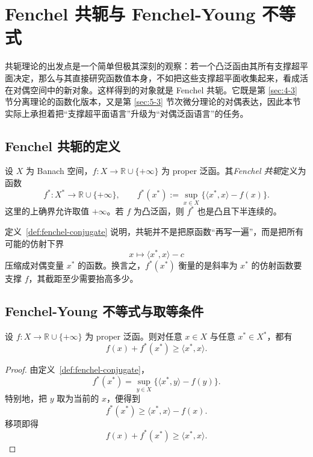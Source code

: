 \section{Fenchel 共轭与 Fenchel-Young 不等式}

\label{sec:6-1}

共轭理论的出发点是一个简单但极其深刻的观察：若一个凸泛函由其所有支撑超平面决定，那么与其直接研究函数值本身，不如把这些支撑超平面收集起来，看成活在对偶空间中的新对象。这样得到的对象就是 Fenchel 共轭。它既是第 \ref{sec:4-3} 节分离理论的函数化版本，又是第 \ref{sec:5-3} 节次微分理论的对偶表达，因此本节实际上承担着把“支撑超平面语言”升级为“对偶泛函语言”的任务。

\subsection{Fenchel 共轭的定义}

\begin{definition}[Fenchel 共轭]\label{def:fenchel-conjugate}
设 $X$ 为 Banach 空间，$f\colon X\to \mathbb R\cup\{+\infty\}$ 为 proper 泛函。其\emph{Fenchel 共轭}定义为函数
\[
f^\ast\colon X^\ast\to \mathbb R\cup\{+\infty\},
\qquad
f^\ast(x^\ast):=\sup_{x\in X}\{\langle x^\ast,x\rangle-f(x)\}.
\]
这里的上确界允许取值 $+\infty$。若 $f$ 为凸泛函，则 $f^\ast$ 也是凸且下半连续的。
\end{definition}

\begin{remark}
定义~\ref{def:fenchel-conjugate} 说明，共轭并不是把原函数“再写一遍”，而是把所有可能的仿射下界
\[
x\mapsto \langle x^\ast,x\rangle-c
\]
压缩成对偶变量 $x^\ast$ 的函数。换言之，$f^\ast(x^\ast)$ 衡量的是斜率为 $x^\ast$ 的仿射函数要支撑 $f$，其截距至少需要抬高多少。
\end{remark}

\subsection{Fenchel-Young 不等式与取等条件}

\begin{proposition}\label{prop:fenchel-young-inequality}
设 $f\colon X\to \mathbb R\cup\{+\infty\}$ 为 proper 泛函。则对任意 $x\in X$ 与任意 $x^\ast\in X^\ast$，都有
\[
f(x)+f^\ast(x^\ast)\ge \langle x^\ast,x\rangle.
\]
\end{proposition}

\begin{proof}
由定义~\ref{def:fenchel-conjugate}，
\[
f^\ast(x^\ast)=\sup_{y\in X}\{\langle x^\ast,y\rangle-f(y)\}.
\]
特别地，把 $y$ 取为当前的 $x$，便得到
\[
f^\ast(x^\ast)\ge \langle x^\ast,x\rangle-f(x).
\]
移项即得
\[
f(x)+f^\ast(x^\ast)\ge \langle x^\ast,x\rangle.
\]
\end{proof}

